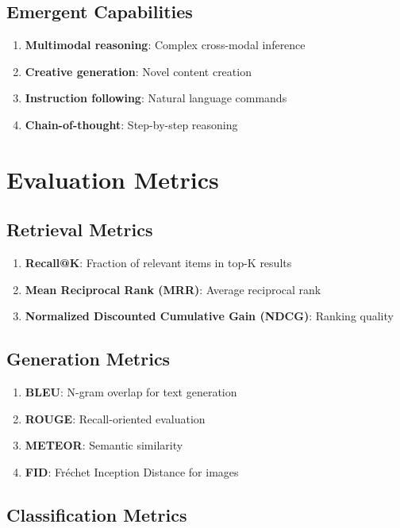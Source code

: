 \documentclass[11pt,a4paper]{article}
\begin{document}
\subsection{Emergent Capabilities}

\begin{enumerate}
\item \textbf{Multimodal reasoning}: Complex cross-modal inference
\item \textbf{Creative generation}: Novel content creation
\item \textbf{Instruction following}: Natural language commands
\item \textbf{Chain-of-thought}: Step-by-step reasoning
\end{enumerate}

\section{Evaluation Metrics}

\subsection{Retrieval Metrics}

\begin{enumerate}
\item \textbf{Recall@K}: Fraction of relevant items in top-K results
\item \textbf{Mean Reciprocal Rank (MRR)}: Average reciprocal rank
\item \textbf{Normalized Discounted Cumulative Gain (NDCG)}: Ranking quality
\end{enumerate}

\subsection{Generation Metrics}

\begin{enumerate}
\item \textbf{BLEU}: N-gram overlap for text generation
\item \textbf{ROUGE}: Recall-oriented evaluation
\item \textbf{METEOR}: Semantic similarity
\item \textbf{FID}: Fréchet Inception Distance for images
\end{enumerate}

\subsection{Classification Metrics}
\end{document}
